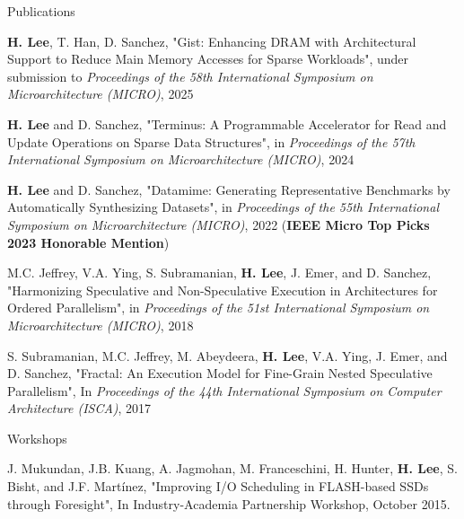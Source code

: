 \documentclass{resume} %
\begin{document}

\begin{rSection}{Publications}

{\bf H. Lee}, T. Han, D. Sanchez,
"Gist: Enhancing DRAM with Architectural Support to Reduce Main Memory Accesses for Sparse Workloads",
under submission to \textit{Proceedings of the 58th International Symposium on Microarchitecture (MICRO)}, 2025 %

{\bf H. Lee} and D. Sanchez,
"Terminus: A Programmable Accelerator for Read and Update Operations on Sparse Data Structures",
in \textit{Proceedings of the 57th International Symposium on Microarchitecture (MICRO)}, 2024 %

{\bf H. Lee} and D. Sanchez,
"Datamime: Generating Representative Benchmarks by Automatically Synthesizing Datasets",
in \textit{Proceedings of the 55th International Symposium on Microarchitecture (MICRO)}, 2022 %
(\textbf{IEEE Micro Top Picks 2023 Honorable Mention})

M.C. Jeffrey, V.A. Ying, S. Subramanian, {\bf H. Lee}, J. Emer, and D. Sanchez,
"Harmonizing Speculative and Non-Speculative Execution in Architectures for Ordered Parallelism",
in \textit{Proceedings of the 51st International Symposium on Microarchitecture (MICRO)}, 2018 %

S. Subramanian, M.C. Jeffrey, M. Abeydeera, {\bf H. Lee}, V.A. Ying, J. Emer, and D. Sanchez, 
"Fractal: An Execution Model for Fine-Grain Nested Speculative Parallelism",
In \textit{Proceedings of the 44th International Symposium on Computer Architecture (ISCA)}, 2017 %

\end{rSection}


\begin{rSection}{Workshops}

J. Mukundan, J.B. Kuang, A. Jagmohan, M. Franceschini, H. Hunter, {\bf H. Lee}, S. Bisht, and J.F. Martínez, "Improving I/O Scheduling in FLASH-based SSDs through Foresight", In Industry-Academia Partnership Workshop, October 2015.

\end{rSection}
\end{document}
